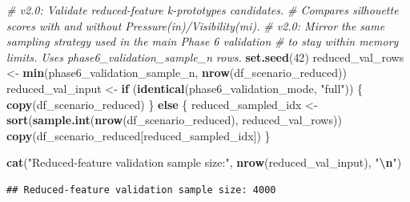 \documentclass[
]{article}
\newenvironment{Shaded}{\begin{snugshade}}{\end{snugshade}}
\newcommand{\CommentTok}[1]{\textcolor[rgb]{0.56,0.35,0.01}{\textit{#1}}}
\newcommand{\ControlFlowTok}[1]{\textcolor[rgb]{0.13,0.29,0.53}{\textbf{#1}}}
\newcommand{\DecValTok}[1]{\textcolor[rgb]{0.00,0.00,0.81}{#1}}
\newcommand{\FunctionTok}[1]{\textcolor[rgb]{0.13,0.29,0.53}{\textbf{#1}}}
\newcommand{\NormalTok}[1]{#1}
\newcommand{\OtherTok}[1]{\textcolor[rgb]{0.56,0.35,0.01}{#1}}
\newcommand{\SpecialCharTok}[1]{\textcolor[rgb]{0.81,0.36,0.00}{\textbf{#1}}}
\newcommand{\StringTok}[1]{\textcolor[rgb]{0.31,0.60,0.02}{#1}}
\begin{document}
\begin{Shaded}
\begin{Highlighting}[]
\CommentTok{\# v2.0: Validate reduced{-}feature k{-}prototypes candidates.}
\CommentTok{\# Compares silhouette scores with and without Pressure(in)/Visibility(mi).}
\CommentTok{\# v2.0: Mirror the same sampling strategy used in the main Phase 6 validation}
\CommentTok{\# to stay within memory limits. Uses phase6\_validation\_sample\_n rows.}
\FunctionTok{set.seed}\NormalTok{(}\DecValTok{42}\NormalTok{)}
\NormalTok{reduced\_val\_rows }\OtherTok{\textless{}{-}} \FunctionTok{min}\NormalTok{(phase6\_validation\_sample\_n, }\FunctionTok{nrow}\NormalTok{(df\_scenario\_reduced))}
\NormalTok{reduced\_val\_input }\OtherTok{\textless{}{-}} \ControlFlowTok{if}\NormalTok{ (}\FunctionTok{identical}\NormalTok{(phase6\_validation\_mode, }\StringTok{"full"}\NormalTok{)) \{}
  \FunctionTok{copy}\NormalTok{(df\_scenario\_reduced)}
\NormalTok{\} }\ControlFlowTok{else}\NormalTok{ \{}
\NormalTok{  reduced\_sampled\_idx }\OtherTok{\textless{}{-}} \FunctionTok{sort}\NormalTok{(}\FunctionTok{sample.int}\NormalTok{(}\FunctionTok{nrow}\NormalTok{(df\_scenario\_reduced), reduced\_val\_rows))}
  \FunctionTok{copy}\NormalTok{(df\_scenario\_reduced[reduced\_sampled\_idx])}
\NormalTok{\}}

\FunctionTok{cat}\NormalTok{(}\StringTok{"Reduced{-}feature validation sample size:"}\NormalTok{, }\FunctionTok{nrow}\NormalTok{(reduced\_val\_input), }\StringTok{"}\SpecialCharTok{\textbackslash{}n}\StringTok{"}\NormalTok{)}
\end{Highlighting}
\end{Shaded}

\begin{verbatim}
## Reduced-feature validation sample size: 4000
\end{verbatim}
\end{document}
